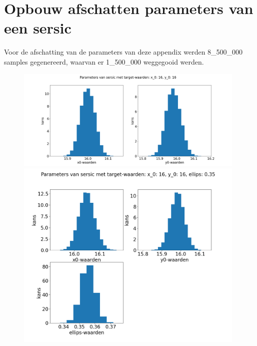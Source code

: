 \section{Opbouw afschatten parameters van een sersic}
Voor de afschatting van de parameters van deze appendix werden 8\_500\_000 samples gegenereerd, waarvan er 1\_500\_000 weggegooid werden.
\label{appendix: opbouw}
\begin{figure}[H]
    \begin{minipage}{0.49\linewidth}
        \includegraphics[width=0.98\textwidth]{Figures/sersic_parameters_metropolis_8500000_1500000_50_y0 (1).png}
    \end{minipage}
    \begin{minipage}{0.49\linewidth}
        \centering
        \includegraphics[width=0.98\textwidth]{Figures/sersic_parameters_metropolis_8500000_1500000_50_ellips.png}
    \end{minipage}

\end{figure}
